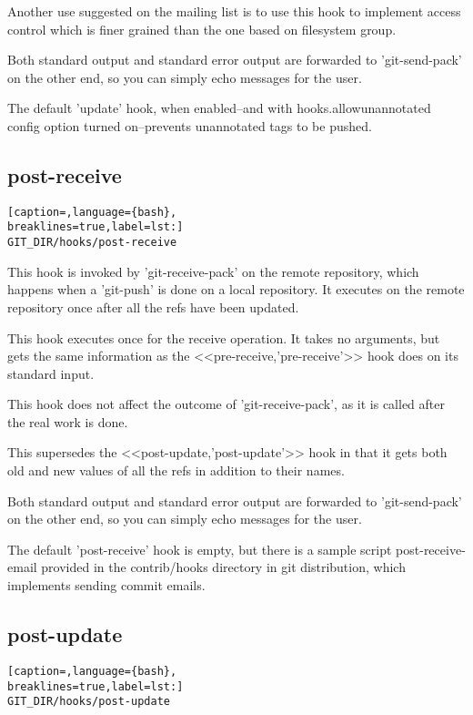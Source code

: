 Another use suggested on the mailing list is to use this hook to implement
access control which is finer grained than the one based on filesystem group.

Both standard output and standard error output are forwarded to 'git-send-pack'
on the other end, so you can simply echo messages for the user.

The default 'update' hook, when enabled--and with hooks.allowunannotated config
option turned on--prevents unannotated tags to be pushed.

\subsection{post-receive}
\lstset{basicstyle=\scriptsize, numbers=none, captionpos=b, tabsize=4}
\begin{lstlisting}[caption=,language={bash},
breaklines=true,label=lst:]
GIT_DIR/hooks/post-receive
\end{lstlisting}

This hook is invoked by 'git-receive-pack' on the remote repository, which
happens when a 'git-push' is done on a local repository. It executes on the
remote repository once after all the refs have been updated.

This hook executes once for the receive operation. It takes no arguments, but
gets the same information as the <<pre-receive,'pre-receive'>> hook does on its
standard input.

This hook does not affect the outcome of 'git-receive-pack', as it is called
after the real work is done.

This supersedes the <<post-update,'post-update'>> hook in that it gets both old
and new values of all the refs in addition to their names.

Both standard output and standard error output are forwarded to 'git-send-pack'
on the other end, so you can simply echo messages for the user.

The default 'post-receive' hook is empty, but there is a sample script
post-receive-email provided in the contrib/hooks directory in git distribution,
which implements sending commit emails.

\subsection{post-update}
\lstset{basicstyle=\scriptsize, numbers=none, captionpos=b, tabsize=4}
\begin{lstlisting}[caption=,language={bash},
breaklines=true,label=lst:]
GIT_DIR/hooks/post-update
\end{lstlisting}

